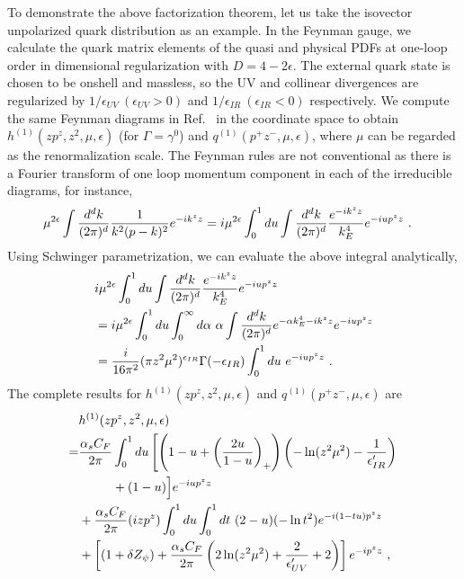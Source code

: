 To demonstrate the above factorization theorem, let us take the isovector unpolarized quark distribution as an example. In the Feynman gauge, we calculate the quark matrix elements of the quasi and physical PDFs at one-loop order in dimensional regularization with $D=4-2\epsilon$. The external quark state is chosen to be onshell and massless, so the UV and collinear divergences are regularized by $1/\epsilon_{UV}\ (\epsilon_{UV}>0)$ and $1/\epsilon_{IR}\ (\epsilon_{IR}<0)$ respectively. We compute the same Feynman diagrams in Ref.~\cite{Xiong:2013bka} in the coordinate space to obtain $h^{(1)}(zp^z,z^2,\mu,\epsilon)$ (for $\Gamma=\gamma^0$) and $q^{(1)}(p^+z^-,\mu,\epsilon)$, where $\mu$ can be regarded as the renormalization scale. The Feynman rules are not conventional as there is a Fourier transform of one loop momentum component in each of the irreducible diagrams, for instance,
\begin{align}
\mu^{2\epsilon}\int {d^d k\over (2\pi)^d} {1\over k^2(p-k)^2} e^{-i k^z z} &=  i\mu^{2\epsilon}\int_0^1 du \int {d^d k\over (2\pi)^d} {e^{-i k^z z}\over k_E^4} e^{ -i u p^z z}\ .
\end{align}
Using Schwinger parametrization, we can evaluate the above integral analytically,
\begin{align}
&i\mu^{2\epsilon}\int_0^1 du\int {d^d k\over (2\pi)^d} {e^{-i k^z z}\over k_E^4} e^{-i u p^z z}\nonumber\\
&= i\mu^{2\epsilon}\int_0^1 du\int_0^\infty d\alpha\ \alpha\int {d^d k\over (2\pi)^d} e^{-\alpha k_E^4-i k^z z} e^{-i u p^z z} \nonumber\\
&= {i\over 16\pi^2}(\pi z^2\mu^2)^{\epsilon_{IR}} \Gamma(-\epsilon_{IR})\int_0^1 du\  e^{-iu p^z z}\ .
\end{align}
The complete results for $h^{(1)}(zp^z,z^2,\mu,\epsilon)$ and $q^{(1)}(p^+z^-,\mu,\epsilon)$ are
\begin{align}
&h^{(1)}(zp^z,z^2,\mu,\epsilon)\nonumber\\
=&{\alpha_sC_F\over 2\pi}\int_0^1 du \left[\left(1-u+\left({2u\over 1-u}\right)_+\right)\left(-\ln(z^2 \mu^2) - {1\over \epsilon'_{IR}}\right)\right.\nonumber\\
&\ \ \ \ \ \ \ \ + (1-u)\Big]e^{-iu p^z z}\nonumber\\
& + {\alpha_sC_F\over 2\pi}(izp^z)\int_0^1 du \int_0^1dt\ (2-u) (-\ln t^2) e^{-i(1-tu) p^z z} \nonumber\\
&  +\left[(1+\delta Z_\psi)+ {\alpha_sC_F\over 2\pi}\left(2\ln(z^2\mu^2) + {2\over \epsilon'_{UV}}+2\right)\right] e^{-i p^z z} \ ,
\end{align}

